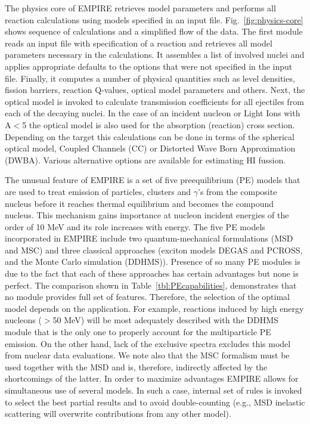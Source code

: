 \documentclass[twocolumn,amsmath,amssymb,10pt,groupedaddress,letter]{revtex4}
\begin{document}
The physics core of EMPIRE retrieves model parameters and performs all reaction calculations using models specified in an input file. Fig.~\ref{fig:physics-core} shows sequence of calculations and a simplified flow of the data. The first module reads an input file with specification of a reaction and retrieves all model parameters necessary in the calculations. It assembles a list of involved nuclei and  applies appropriate defaults to the options that were not specified in the input file. Finally, it computes a number of physical quantities such as level densities, fission barriers, reaction Q-values, optical model parameters and others. Next, the optical model is  invoked to calculate transmission coefficients for all ejectiles from each of the decaying nuclei. In the case of an incident nucleon or Light Ions with A$<$5 the optical model is also used for the absorption (reaction) cross section. Depending on the target this calculations can be done in terms of the spherical optical model, Coupled Channels (CC) or Distorted Wave Born Approximation (DWBA). Various alternative options are available for estimating HI fussion.

The unusual feature of EMPIRE is a set of five preequilibrium (PE) models that are used to treat emission of particles, clusters and $\gamma$'s from the composite nucleus before it reaches thermal equilibrium and becomes the compound nucleus. This mechanism gains importance at nucleon incident energies of the order of 10 MeV and its role increases with energy.  The five PE models incorporated in EMPIRE include two quantum-mechanical formulations (MSD and MSC) and three classical approaches (exciton models DEGAS and PCROSS, and the Monte Carlo simulation (DDHMS)). Presence of so many PE modules is due to the fact that each of these approaches has certain advantages but none is perfect. The comparison shown in  Table~\ref{tbl:PEcapabilities},  demonstrates that no module provides full set of features. Therefore, the selection of the optimal model depends on the application. For example, reactions induced by high energy nucleons ($>$50 MeV) will be most adequately described with the DDHMS module that is the only one to properly account for the multiparticle PE emission. On the other hand, lack of the exclusive spectra excludes this model from nuclear data evaluations. We note also that the MSC formalism must be used together with the MSD and is, therefore, indirectly affected by the shortcomings of the  latter. In order to maximize advantages EMPIRE allows for simultaneous use of several models. In such a case, internal set of rules is invoked to select the best partial results and to avoid double-counting (e.g., MSD inelastic scattering will overwrite contributions from any other model).
\end{document}
